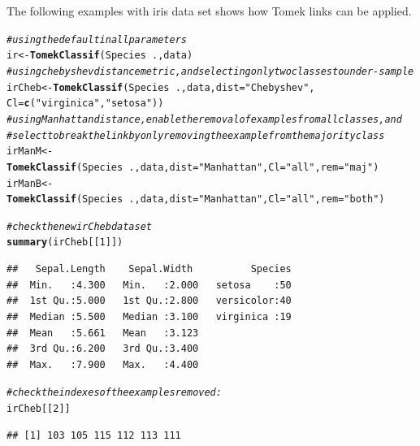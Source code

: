 \documentclass[10pt,a4paper]{article}\usepackage[]{graphicx}\usepackage[]{color}
\makeatletter
\newcommand{\hlnum}[1]{\textcolor[rgb]{0.686,0.059,0.569}{#1}}%
\newcommand{\hlstr}[1]{\textcolor[rgb]{0.192,0.494,0.8}{#1}}%
\newcommand{\hlcom}[1]{\textcolor[rgb]{0.678,0.584,0.686}{\textit{#1}}}%
\newcommand{\hlopt}[1]{\textcolor[rgb]{0,0,0}{#1}}%
\newcommand{\hlstd}[1]{\textcolor[rgb]{0.345,0.345,0.345}{#1}}%
\newcommand{\hlkwb}[1]{\textcolor[rgb]{0.69,0.353,0.396}{#1}}%
\newcommand{\hlkwc}[1]{\textcolor[rgb]{0.333,0.667,0.333}{#1}}%
\newcommand{\hlkwd}[1]{\textcolor[rgb]{0.737,0.353,0.396}{\textbf{#1}}}%
\newenvironment{kframe}{%
 \def\at@end@of@kframe{}%
 \ifinner\ifhmode%
  \def\at@end@of@kframe{\end{minipage}}%
  \begin{minipage}{\columnwidth}%
 \fi\fi%
 \def\FrameCommand##1{\hskip\@totalleftmargin \hskip-\fboxsep
 \colorbox{shadecolor}{##1}\hskip-\fboxsep
     \hskip-\linewidth \hskip-\@totalleftmargin \hskip\columnwidth}%
 \MakeFramed {\advance\hsize-\width
   \@totalleftmargin\z@ \linewidth\hsize
   \@setminipage}}%
 {\par\unskip\endMakeFramed%
 \at@end@of@kframe}
\newenvironment{knitrout}{}{} %
\makeatother
\begin{document}
The following examples with iris data set shows how Tomek links can be applied.


\begin{knitrout}\footnotesize
{}\color{fgcolor}\begin{kframe}
\begin{alltt}
\hlcom{# using the default in all parameters}
  \hlstd{ir} \hlkwb{<-} \hlkwd{TomekClassif}\hlstd{(Species}\hlopt{~}\hlstd{., data)}
\hlcom{# using chebyshev distance metric, and selecting only two classes to under-sample}
  \hlstd{irCheb} \hlkwb{<-} \hlkwd{TomekClassif}\hlstd{(Species}\hlopt{~}\hlstd{., data,} \hlkwc{dist}\hlstd{=}\hlstr{"Chebyshev"}\hlstd{,}
                         \hlkwc{Cl}\hlstd{=}\hlkwd{c}\hlstd{(}\hlstr{"virginica"}\hlstd{,} \hlstr{"setosa"}\hlstd{))}
\hlcom{# using Manhattan distance, enable the removal of examples from all classes, and}
\hlcom{# select to break the link by only removing the example from the majority class}
  \hlstd{irManM} \hlkwb{<-} \hlkwd{TomekClassif}\hlstd{(Species}\hlopt{~}\hlstd{., data,} \hlkwc{dist}\hlstd{=}\hlstr{"Manhattan"}\hlstd{,} \hlkwc{Cl}\hlstd{=}\hlstr{"all"}\hlstd{,} \hlkwc{rem}\hlstd{=}\hlstr{"maj"}\hlstd{)}
  \hlstd{irManB} \hlkwb{<-} \hlkwd{TomekClassif}\hlstd{(Species}\hlopt{~}\hlstd{., data,} \hlkwc{dist}\hlstd{=}\hlstr{"Manhattan"}\hlstd{,} \hlkwc{Cl}\hlstd{=}\hlstr{"all"}\hlstd{,} \hlkwc{rem}\hlstd{=}\hlstr{"both"}\hlstd{)}

\hlcom{# check the new irCheb data set}
\hlkwd{summary}\hlstd{(irCheb[[}\hlnum{1}\hlstd{]])}
\end{alltt}
\begin{verbatim}
##   Sepal.Length    Sepal.Width          Species  
##  Min.   :4.300   Min.   :2.000   setosa    :50  
##  1st Qu.:5.000   1st Qu.:2.800   versicolor:40  
##  Median :5.500   Median :3.100   virginica :19  
##  Mean   :5.661   Mean   :3.123                  
##  3rd Qu.:6.200   3rd Qu.:3.400                  
##  Max.   :7.900   Max.   :4.400
\end{verbatim}
\begin{alltt}
\hlcom{# check the indexes of the examples removed:}
\hlstd{irCheb[[}\hlnum{2}\hlstd{]]}
\end{alltt}
\begin{verbatim}
## [1] 103 105 115 112 113 111
\end{verbatim}
\end{kframe}
\end{knitrout}
\end{document}
